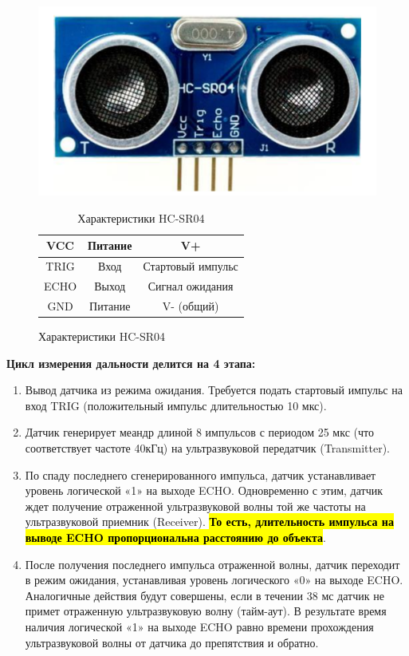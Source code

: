 \documentclass[12pt]{article}
\begin{document}
\begin{figure}[H]
	\centering
	\begin{minipage}[b]{0.45\textwidth}
		\includegraphics[width=\textwidth]{images/screenshot005}
		\caption{Внешний вид и распиновка HC-SR04}
		\label{fig:screenshot005}
	\end{minipage}
	\hfill
	\begin{minipage}[b]{0.45\textwidth}
		\begin{table}[H]
			\centering
			\caption{Характеристики HC-SR04}\label{table:pinout}
			\begin{tabular}{c|c|c}
				\toprule
				VCC & Питание & V+ \\
				\hline
				TRIG & Вход & Стартовый импульс\\
				\hline
				ECHO & Выход & Сигнал ожидания \\
				\hline
				GND & Питание & V- (общий) \\
				\bottomrule
			\end{tabular}
		\end{table}
	\end{minipage}
\end{figure}

\newpage
\textbf{Цикл измерения дальности делится на 4 этапа:}
\begin{enumerate}
	\item Вывод датчика из режима ожидания. Требуется подать стартовый импульс на вход TRIG (положительный импульс длительностью 10 мкс).
	\item Датчик генерирует меандр длиной  8 импульсов с периодом 25 мкс (что соответствует частоте 40кГц) на ультразвуковой передатчик (Transmitter).
	\item По спаду последнего сгенерированного импульса, датчик устанавливает уровень логической «1» на выходе ECHO. Одновременно с этим, датчик ждет получение отраженной ультразвуковой волны той же частоты на ультразвуковой приемник (Receiver). \hl{\textbf{То есть, длительность импульса на выводе ECHO пропорциональна расстоянию до объекта}}.
	\item После получения последнего импульса отраженной волны, датчик переходит в режим ожидания, устанавливая уровень логического «0» на выходе ECHO. Аналогичные действия будут совершены, если в течении 38 мс датчик не примет отраженную ультразвуковую волну (тайм-аут). В результате время наличия логической «1» на выходе ECHO равно времени прохождения ультразвуковой волны от датчика до препятствия и обратно.
\end{enumerate}
\end{document}
